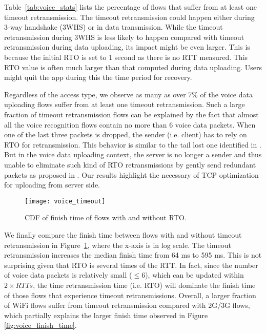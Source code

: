 Table~\ref{tab:voice_stats} lists the percentage of flows that suffer from at least one timeout retransmission. The timeout retransmission could happen either during 3-way handshake (3WHS) or in data transmission. While the timeout retransmission during 3WHS is less likely to happen compared with timeout retransmission during data uploading, its impact might be even larger. This is because the initial RTO is set to 1 second \cite{rfc62982011computing} as there is no RTT measured. This RTO value is often much larger than that computed during data uploading. Users might quit the app during this the time period for recovery. 

Regardless of the access type, we observe as many as over 7\% of the voice data uploading flows suffer from at least one timeout retransmission. Such a large fraction of timeout retransmission flows can be explained by the fact that almost all the voice recognition flows contain no more than 6 voice data packets. When one of the last three packets is dropped, the sender (i.e. client) has to rely on RTO for retransmission. This behavior is similar to the tail lost one identified in \cite{flach2013reducing}. But in the voice data uploading context, the server is no longer a sender and thus unable to eliminate such kind of RTO retransmissions by gently send redundant packets as proposed in \cite{flach2013reducing}. Our results highlight the necessary of TCP optimization for uploading from server side. 

\begin{figure}[th]
\centering
	\texttt{[image: voice\_timeout]}
\caption{CDF of finish time of flows with and without RTO.}
\label{fig:voice_rto}
\end{figure}

We finally compare the finish time between flows with and without timeout retransmission in Figure~\ref{fig:voice_rto}, where the x-axis is in log scale. The timeout retransmission increases the median finish time from 64 ms to 595 ms. This is not surprising given that RTO is several times of the RTT. In fact, since the number of voice data packets is relatively small ($\le 6$), which can be updated within $2\times RTTs$, the time retransmission time (i.e. RTO) will dominate the finish time of those flows that experience timeout retransmissions.  Overall, a larger fraction of WiFi flows suffer from timeout retransmission compared with 2G/3G flows, which partially explains the larger finish time observed in Figure \ref{fig:voice_finish_time}.

